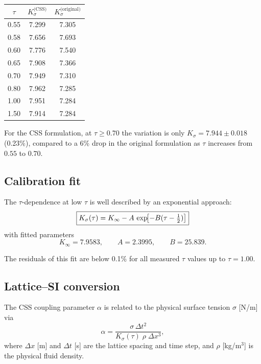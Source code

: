 \documentclass[11pt,a4paper]{article}
\begin{document}
\begin{center}
\begin{tabular}{ccc}
  \toprule
  $\tau$ & $K_\sigma^{\text{(CSS)}}$ & $K_\sigma^{\text{(original)}}$ \\
  \midrule
  0.55 & 7.299 & 7.305 \\
  0.58 & 7.656 & 7.693 \\
  0.60 & 7.776 & 7.540 \\
  0.65 & 7.908 & 7.366 \\
  0.70 & 7.949 & 7.310 \\
  0.80 & 7.962 & 7.285 \\
  1.00 & 7.951 & 7.284 \\
  1.50 & 7.914 & 7.284 \\
  \bottomrule
\end{tabular}
\end{center}

For the CSS formulation, at $\tau \ge 0.70$ the variation is only
$K_\sigma = 7.944 \pm 0.018$ (0.23\%), compared to a 6\% drop in the
original formulation as $\tau$ increases from $0.55$ to $0.70$.

\subsection{Calibration fit}

The $\tau$-dependence at low $\tau$ is well described by an exponential
approach:
\begin{equation}
  \boxed{%
  K_\sigma(\tau) = K_\infty - A\,\exp\!\bigl[-B(\tau-\tfrac{1}{2})\bigr]
  }
  \label{eq:Kfit}
\end{equation}
with fitted parameters
\begin{equation}
  K_\infty = 7.9583, \qquad A = 2.3995, \qquad B = 25.839.
  \label{eq:fitparams}
\end{equation}

The residuals of this fit are below 0.1\% for all measured $\tau$ values
up to $\tau=1.00$.

\subsection{Lattice--SI conversion}

The CSS coupling parameter $\alpha$ is related to the physical surface
tension $\sigma$ [N/m] via
\begin{equation}
  \alpha = \frac{\sigma\,\Delta t^2}{K_\sigma(\tau)\;\rho\;\Delta x^3},
  \label{eq:alpha}
\end{equation}
where $\Delta x$ [m] and $\Delta t$ [s] are the lattice spacing and time
step, and $\rho$ [kg/m$^3$] is the physical fluid density.
\end{document}
